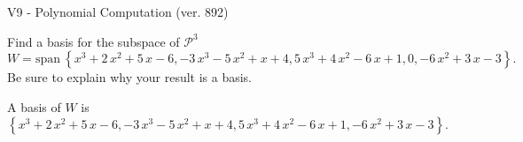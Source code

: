 \begin{exercise}
  \begin{exerciseTitle}V9 - Polynomial Computation (ver. 892)\end{exerciseTitle}
  \begin{exerciseStatement}
    Find a basis for the subspace of \(\mathcal{P}^3\) 
\[W=\mathrm{span}\ \left\{x^{3} + 2 \, x^{2} + 5 \, x - 6 , -3 \, x^{3} - 5 \, x^{2} + x + 4 , 5 \, x^{3} + 4 \, x^{2} - 6 \, x + 1 , 0 , -6 \, x^{2} + 3 \, x - 3\right\}.\]
 Be sure to explain why your result is a basis.


  \end{exerciseStatement}
  \begin{exerciseAnswer}
   A basis of \(W\) is  \(\left\{x^{3} + 2 \, x^{2} + 5 \, x - 6 , -3 \, x^{3} - 5 \, x^{2} + x + 4 , 5 \, x^{3} + 4 \, x^{2} - 6 \, x + 1 , -6 \, x^{2} + 3 \, x - 3\right\}\).
  


  \end{exerciseAnswer}
\end{exercise}